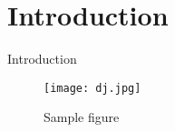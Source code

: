 \section{Introduction}

Introduction \cite{Euslisp}

\begin{figure}[htb]
 \begin{center}
  \texttt{[image: dj.jpg]}
  \caption{Sample figure}
  \label{figure:sample}
 \end{center}
\end{figure}

